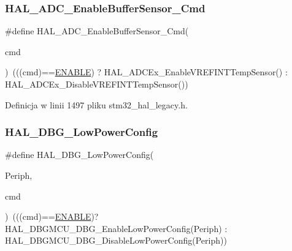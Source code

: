 \subsubsection{\texorpdfstring{H\+A\+L\+\_\+\+A\+D\+C\+\_\+\+Enable\+Buffer\+Sensor\+\_\+\+Cmd}{HAL\_ADC\_EnableBufferSensor\_Cmd}}
{\footnotesize\ttfamily \#define H\+A\+L\+\_\+\+A\+D\+C\+\_\+\+Enable\+Buffer\+Sensor\+\_\+\+Cmd(\begin{DoxyParamCaption}\item[{}]{cmd }\end{DoxyParamCaption})~(((cmd)==\hyperlink{group___exported__types_ggac9a7e9a35d2513ec15c3b537aaa4fba1a7d46875fa3ebd2c34d2756950eda83bf}{E\+N\+A\+B\+LE}) ?  H\+A\+L\+\_\+\+A\+D\+C\+Ex\+\_\+\+Enable\+V\+R\+E\+F\+I\+N\+T\+Temp\+Sensor() \+: H\+A\+L\+\_\+\+A\+D\+C\+Ex\+\_\+\+Disable\+V\+R\+E\+F\+I\+N\+T\+Temp\+Sensor())}



Definicja w linii 1497 pliku stm32\+\_\+hal\+\_\+legacy.\+h.

\mbox{\label{group___h_a_l___aliased___functions_gaeece8fd3268534ce330c635222ce79a3}} 
\subsubsection{\texorpdfstring{H\+A\+L\+\_\+\+D\+B\+G\+\_\+\+Low\+Power\+Config}{HAL\_DBG\_LowPowerConfig}}
{\footnotesize\ttfamily \#define H\+A\+L\+\_\+\+D\+B\+G\+\_\+\+Low\+Power\+Config(\begin{DoxyParamCaption}\item[{}]{Periph,  }\item[{}]{cmd }\end{DoxyParamCaption})~(((cmd)==\hyperlink{group___exported__types_ggac9a7e9a35d2513ec15c3b537aaa4fba1a7d46875fa3ebd2c34d2756950eda83bf}{E\+N\+A\+B\+LE})? H\+A\+L\+\_\+\+D\+B\+G\+M\+C\+U\+\_\+\+D\+B\+G\+\_\+\+Enable\+Low\+Power\+Config(Periph) \+: H\+A\+L\+\_\+\+D\+B\+G\+M\+C\+U\+\_\+\+D\+B\+G\+\_\+\+Disable\+Low\+Power\+Config(Periph))}



